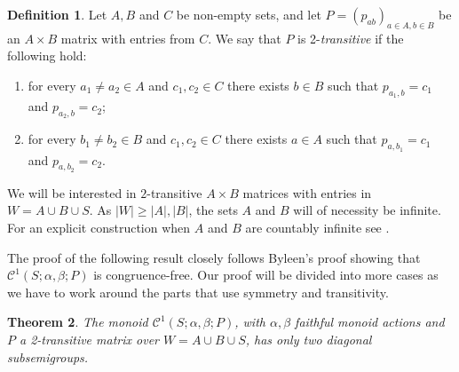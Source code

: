 \documentclass[a4paper, 12pt,reqno]{amsart}
\theoremstyle{plain}
\newtheorem{thm}{Theorem}[section]
\theoremstyle{definition}
\newtheorem{definition}[thm]{Definition}
\theoremstyle{remark}
\newcommand{\CS}{\mathcal{C}^1(S;\alpha,\beta;P)}
\begin{document}
\begin{definition}
    Let $A,B$ and $C$ be non-empty sets, and let $P=(p_{ab})_{a\in A,b\in B}$ be an $A\times B$ matrix with entries from $C$. We say that $P$ is 
   2-\emph{transitive} if the following hold:
    \begin{enumerate}
        \item for every $a_1 \neq a_2 \in A$ and $c_1,c_2 \in C$ there exists $b \in B$ such that $p_{a_1,b} = c_1$ and $p_{a_2,b} = c_2$;
        \item for every $b_1 \neq b_2 \in B$ and $c_1,c_2 \in C$ there exists $a \in A$ such that $p_{a,b_1} = c_1$ and $p_{a,b_2} = c_2$.
    \end{enumerate}
\end{definition}

We will be interested in $2$-transitive $A \times B$ matrices with entries in $W = A \cup B \cup S$. As $|W| \geq |A|,|B|$,  the sets $A$ and $B$ will of necessity be infinite.
For an explicit construction when $A$ and $B$ are countably infinite see \cite{QR2010}.

The proof of the following result closely follows Byleen's proof showing that $\CS$ is congruence-free.
Our proof will be divided into more cases as we have to work around the parts that use symmetry and transitivity.

\begin{thm}\label{byleen}
    The monoid $\CS$, with $\alpha,\beta$ faithful monoid actions and $P$ a 2-transitive matrix over $W = A \cup B \cup S$, has only two diagonal subsemigroups.
\end{thm}
\end{document}
